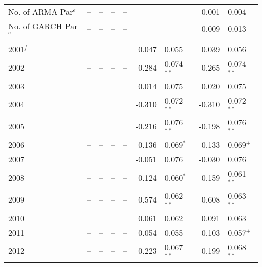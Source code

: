 \begin{table}
\begin{tabular}{l r l r l r l r l}
        No. of ARMA Par$^{e}$              &      -- & --           &      -- & --           &         &              &  -0.001 & 0.004         \\
        No. of GARCH Par$^{e}$             &      -- & --           &      -- & --           &         &              &  -0.009 & 0.013         \\  \\      
        2001$^{f}$                         &      -- & --           &      -- & --           &   0.047 & 0.055        &   0.039 & 0.056         \\
        2002                               &      -- & --           &      -- & --           &  -0.284 & 0.074$^{**}$ &  -0.265 & 0.074$^{**}$  \\
        2003                               &      -- & --           &      -- & --           &   0.014 & 0.075        &   0.020 & 0.075         \\
        2004                               &      -- & --           &      -- & --           &  -0.310 & 0.072$^{**}$ &  -0.310 & 0.072$^{**}$  \\
        2005                               &      -- & --           &      -- & --           &  -0.216 & 0.076$^{**}$ &  -0.198 & 0.076$^{**}$  \\
        2006                               &      -- & --           &      -- & --           &  -0.136 & 0.069$^{*}$  &  -0.133 & 0.069$^{+}$   \\
        2007                               &      -- & --           &      -- & --           &  -0.051 & 0.076        &  -0.030 & 0.076         \\
        2008                               &      -- & --           &      -- & --           &   0.124 & 0.060$^{*}$  &   0.159 & 0.061$^{**}$  \\
        2009                               &      -- & --           &      -- & --           &   0.574 & 0.062$^{**}$ &   0.608 & 0.063$^{**}$  \\
        2010                               &      -- & --           &      -- & --           &   0.061 & 0.062        &   0.091 & 0.063         \\
        2011                               &      -- & --           &      -- & --           &   0.054 & 0.055        &   0.103 & 0.057$^{+}$   \\
        2012                               &      -- & --           &      -- & --           &  -0.223 & 0.067$^{**}$ &  -0.199 & 0.068$^{**}$  \\

\end{tabular}
\end{table}
